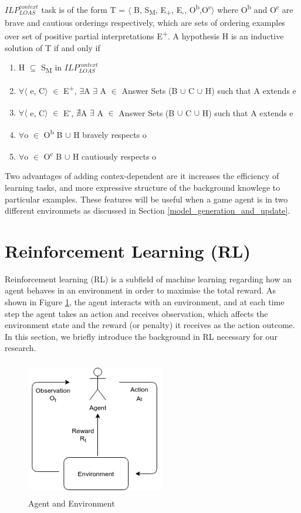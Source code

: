 \documentclass[12pt,twoside]{report}
\begin{document}
$ILP_{LOAS}^{context}$ task is of the form T = $\langle$ B, S\textsubscript{M}, E\textsubscript{+}, E\textsubscript{-}, O\textsuperscript{b},O\textsuperscript{c}$\rangle$ where O\textsuperscript{b} and O\textsuperscript{c} are brave and cautious orderings respectively, which are sets of ordering examples over set of positive partial interpretations E\textsuperscript{+}.
A hypothesis H is an inductive solution of T if and only if
\begin{enumerate}
\item H $\subseteq$ S\textsubscript{M} in $ILP_{LOAS}^{context}$
\item $\forall$$\langle$ e, C$\rangle$ $\in$ E\textsuperscript{+}, $\exists$A $\exists$ A $\in$ Answer Sets (B $\cup$ C $\cup$ H) such that A extends e
\item $\forall$$\langle$ e, C$\rangle$ $\in$ E\textsuperscript{-}, $\nexists$A $\exists$ A $\in$ Answer Sets (B $\cup$ C $\cup$ H) such that A extends e
\item $\forall$o $\in$ O\textsuperscript{b} B $\cup$ H bravely respects o
\item $\forall$o $\in$ O\textsuperscript{c} B $\cup$ H cautiously respects o
\end{enumerate}

Two advantages of adding contex-dependent are it increases the efficiency of learning tasks, and more expressive structure of the background knowlege to particular examples. These features will be useful when a game agent is in two different environmets as discussed in Section \ref{model_generation_and_update}.

\section{Reinforcement Learning (RL)}
\label{rl}
Reinforcement learning (RL) is a subfield of machine learning regarding how an agent behaves in an environment in order to maximise the total reward. As shown in Figure \ref{agent_env}, the agent interacts with an environment, and at each time step the agent takes an action and receives observation, which affects the environment state and the reward (or penalty) it receives as the action outcome. In this section, we briefly introduce the background in RL necessary for our research.

\begin{figure}[!htb]
\centering
\includegraphics[width=6cm, height=6cm]{./figures/agent_env}
\caption{Agent and Environment}
\label{agent_env}
\end{figure}
\end{document}

